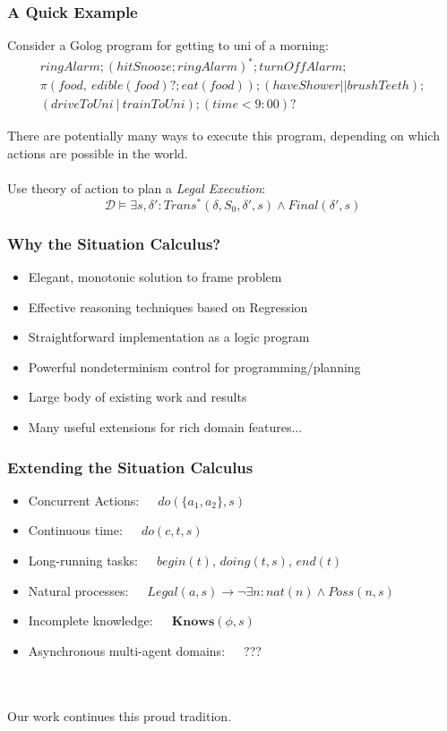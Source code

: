 \documentclass{beamer}
\newcommand{\Dt}{\mathcal{D}}
\newcommand{\Knows}{\mathbf{Knows}}
\begin{document}
\begin{frame}
\frametitle{A Quick Example}
Consider a Golog program for getting to uni of a morning:\[
\begin{array}{c}
ringAlarm;(hitSnooze; ringAlarm)^*;turnOffAlarm;\\
\pi(food,\ edible(food)?;eat(food)); (haveShower || brushTeeth);\\
(driveToUni\ |\ trainToUni); (time<9:00)?
\end{array}\]

There are potentially many ways to execute this program, depending on which 
actions are possible in the world.
\pause
\ \\
\ \\
Use theory of action to plan a \emph{Legal Execution}:\[
\Dt \models \exists s,\delta': Trans^{*}(\delta,S_0,\delta',s) \wedge Final(\delta',s)\]

\end{frame}

\begin{frame}
\frametitle{Why the Situation Calculus?}
\begin{itemize}
\item Elegant, monotonic solution to frame problem
\item Effective reasoning techniques based on Regression
\item Straightforward implementation as a logic program
\item Powerful nondeterminism control for programming/planning
\item Large body of existing work and results
\item Many useful extensions for rich domain features...
\end{itemize}
\end{frame}

\begin{frame}
\frametitle{Extending the Situation Calculus}
\begin{itemize}
\pause
\item Concurrent Actions:\ \ \ $do(\{a_1,a_2\},s)$
\pause
\item Continuous time:\ \ \ $do(c,t,s)$
\pause
\item Long-running tasks:\ \ \ $begin(t)$, $doing(t,s)$, $end(t)$
\pause
\item Natural processes:\ \ \ $Legal(a,s)\rightarrow\neg\exists n: nat(n) \wedge Poss(n,s)$
\pause
\item Incomplete knowledge:\ \ \ $\Knows(\phi,s)$
\pause
\item Asynchronous multi-agent domains:\ \ \ ???
\end{itemize}
\ \\
\ \\
\pause
Our work continues this proud tradition.
\end{frame}
\end{document}
